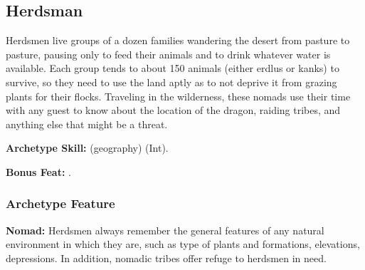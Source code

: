 \subsection{Herdsman}
Herdsmen live groups of a dozen families wandering the desert from pasture to pasture, pausing only to feed their animals and to drink whatever water is available. Each group tends to about 150 animals (either erdlus or kanks) to survive, so they need to use the land aptly as to not deprive it from grazing plants for their flocks. Traveling in the wilderness, these nomads use their time with any guest to know about the location of the dragon, raiding tribes, and anything else that might be a threat. 

\textbf{Archetype Skill:}  (geography) (Int).

\textbf{Bonus Feat:} .

\subsubsection{Archetype Feature}
\textbf{Nomad:} Herdsmen always remember the general features of any natural environment in which they are, such as type of plants and  formations, elevations, depressions. In addition, nomadic tribes offer refuge to herdsmen in need.
